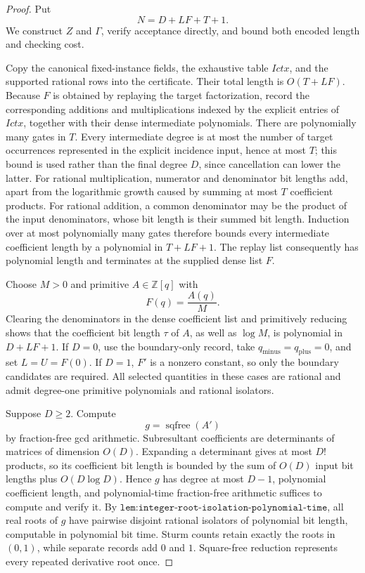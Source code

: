 \documentclass{article}
\begin{document}
\begin{proof}
Put
\[
 N=D+LF+T+1.
\]
We construct \(Z\) and \(\Gamma\), verify acceptance directly, and bound both encoded length and checking cost.

Copy the canonical fixed-instance fields, the exhaustive table \(Ictx\), and the supported rational rows into the certificate.  Their total length is \(O(T+LF)\).  Because \(F\) is obtained by replaying the target factorization, record the corresponding additions and multiplications indexed by the explicit entries of \(Ictx\), together with their dense intermediate polynomials.  There are polynomially many gates in \(T\).  Every intermediate degree is at most the number of target occurrences represented in the explicit incidence input, hence at most \(T\); this bound is used rather than the final degree \(D\), since cancellation can lower the latter.  For rational multiplication, numerator and denominator bit lengths add, apart from the logarithmic growth caused by summing at most \(T\) coefficient products.  For rational addition, a common denominator may be the product of the input denominators, whose bit length is their summed bit length.  Induction over at most polynomially many gates therefore bounds every intermediate coefficient length by a polynomial in \(T+LF+1\).  The replay list consequently has polynomial length and terminates at the supplied dense list \(F\).

Choose \(M>0\) and primitive \(A\in\mathbb Z[q]\) with
\[
 F(q)=\frac{A(q)}{M}.
\]
Clearing the denominators in the dense coefficient list and primitively reducing shows that the coefficient bit length \(\tau\) of \(A\), as well as \(\log M\), is polynomial in \(D+LF+1\).  If \(D=0\), use the boundary-only record, take \(q_{\mathrm{minus}}=q_{\mathrm{plus}}=0\), and set \(L=U=F(0)\).  If \(D=1\), \(F'\) is a nonzero constant, so only the boundary candidates are required.  All selected quantities in these cases are rational and admit degree-one primitive polynomials and rational isolators.

Suppose \(D\geq2\).  Compute
\[
 g=\operatorname{sqfree}(A')
\]
by fraction-free gcd arithmetic.  Subresultant coefficients are determinants of matrices of dimension \(O(D)\).  Expanding a determinant gives at most \(D!\) products, so its coefficient bit length is bounded by the sum of \(O(D)\) input bit lengths plus \(O(D\log D)\).  Hence \(g\) has degree at most \(D-1\), polynomial coefficient length, and polynomial-time fraction-free arithmetic suffices to compute and verify it.  By \(\texttt{lem:integer-root-isolation-polynomial-time}\), all real roots of \(g\) have pairwise disjoint rational isolators of polynomial bit length, computable in polynomial bit time.  Sturm counts retain exactly the roots in \((0,1)\), while separate records add \(0\) and \(1\).  Square-free reduction represents every repeated derivative root once.


\end{proof}
\end{document}
